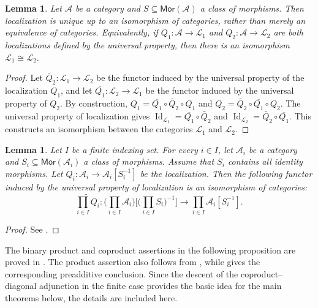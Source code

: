\documentclass[10pt,a4paper]{amsart}
\theoremstyle{plain}
\newtheorem{lemma}[theorem]{Lemma}
\theoremstyle{definition}
\theoremstyle{remark}
\begin{document}
\begin{lemma}\label{lem_loc_uni}
  Let $\mathcal{A}$ be a category and $S \subseteq \mathsf{Mor}(\mathcal{A})$ a class of morphisms.
  Then localization is unique up to an isomorphism of categories, rather than merely an equivalence of categories.
  Equivalently, if $Q_1:\mathcal A\longrightarrow \mathcal{L}_1$ and $Q_2:\mathcal A\longrightarrow \mathcal{L}_2$ are both localizations defined by the universal property, then there is an isomorphism $\mathcal{L}_1 \cong \mathcal{L}_2$.
\end{lemma}

\begin{proof}
  Let $\widetilde {Q_2} : \mathcal{L}_1 \longrightarrow \mathcal{L}_2$ be the functor induced by the universal property of the localization $Q_1$, and let $\overline{Q_1} : \mathcal{L}_2 \longrightarrow \mathcal{L}_1$ be the functor induced by the universal property of $Q_2$.
  By construction, $Q_1 = \overline{Q_1} \circ \widetilde{Q_2} \circ Q_1$ and $Q_2 = \widetilde{Q_2} \circ \overline{Q_1} \circ Q_2$.
  The universal property of localization gives $\operatorname{Id}_{\mathcal{L}_1} = \overline{Q_1} \circ \widetilde{Q_2}$ and $\operatorname{Id}_{\mathcal{L}_2} = \widetilde{Q_2} \circ \overline{Q_1}$.
  This constructs an isomorphism between the categories $\mathcal{L}_1$ and $\mathcal{L}_2$.
\end{proof}

\begin{lemma}\label{lem:localization-binary-product}
  Let $I$ be a finite indexing set.
  For every $i \in I$, let $\mathcal{A}_i$ be a category and $S_i \subseteq \mathsf{Mor}(\mathcal{A}_i)$ a class of morphisms.
  Assume that $S_i$ contains all identity morphisms.
  Let $Q_i : \mathcal{A}_i \longrightarrow \mathcal{A}_i[S_i^{-1}]$ be the localization.
  Then the following functor induced by the universal property of localization is an isomorphism of categories:
  \[
    \widetilde {\prod_{i \in I} Q_i} :
    \bigg(\prod_{i \in I} \mathcal{A}_i \bigg)\bigg[\big(\prod_{i \in I}S_i\big)^{-1}\bigg]
    \longrightarrow\prod_{i \in I}\mathcal{A}_i[S_i^{-1}].
  \]
\end{lemma}

\begin{proof}
  See \cite[Lemma~2.1.7, pp.~74--75]{MaltsiniotisGrothendieck}.
\end{proof}

The binary product and coproduct assertions in the following proposition are proved in \cite[Proposition~2.1.8, p.~75]{MaltsiniotisGrothendieck}.
The product assertion also follows from \cite[Theorem~1.3, p.~1526]{TroninProducts}, while \cite[Theorem~3.1, pp.~1535--1536]{TroninProducts} gives the corresponding preadditive conclusion.
Since the descent of the coproduct--diagonal adjunction in the finite case provides the basic idea for the main theorems below, the details are included here.
\end{document}
